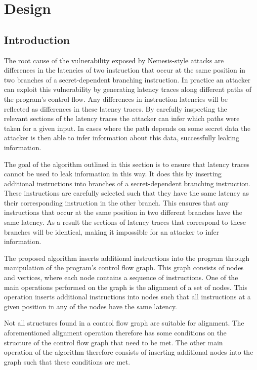 
\chapter{Design}
\label{cha:design}

\section{Introduction}

The root cause of the vulnerability exposed by Nemesis-style attacks are differences in the latencies of two instruction that occur at the same 
position in two branches of a secret-dependent branching instruction. 
In practice an attacker can exploit this vulnerability by generating latency traces along different paths of the program's control flow. 
Any differences in instruction latencies will be reflected as differences in these latency traces. 
By carefully inspecting the relevant sections of the latency traces the attacker can infer which paths were taken for a given input. 
In cases where the path depends on some secret data the attacker is then able to infer information about this data, successfully leaking information. 

The goal of the algorithm outlined in this section is to ensure that latency traces cannot be used to leak information in this way.
It does this by inserting additional instructions into branches of a secret-dependent branching instruction. These instructions 
are carefully selected such that they have the same latency as their corresponding instruction in the other branch. This ensures that
any instructions that occur at the same position in two different branches have the same latency. As a result the sections of latency traces
that correspond to these branches will be identical, making it impossible for an attacker to infer information. 


The proposed algorithm inserts additional instructions into the program through manipulation of the program's control flow graph. 
This graph consists of nodes and vertices, where each node contains a sequence of instructions. 
One of the main operations performed on the graph is the alignment of a set of nodes. 
This operation inserts additional instructions into nodes such that all instructions at a given position in any of the nodes have the same latency. 

Not all structures found in a control flow graph are suitable for alignment. The aforementioned alignment operation therefore has some conditions on the structure of the control flow graph that need to be met. 
The other main operation of the algorithm therefore consists of inserting additional nodes into the graph such that these conditions are met. 

